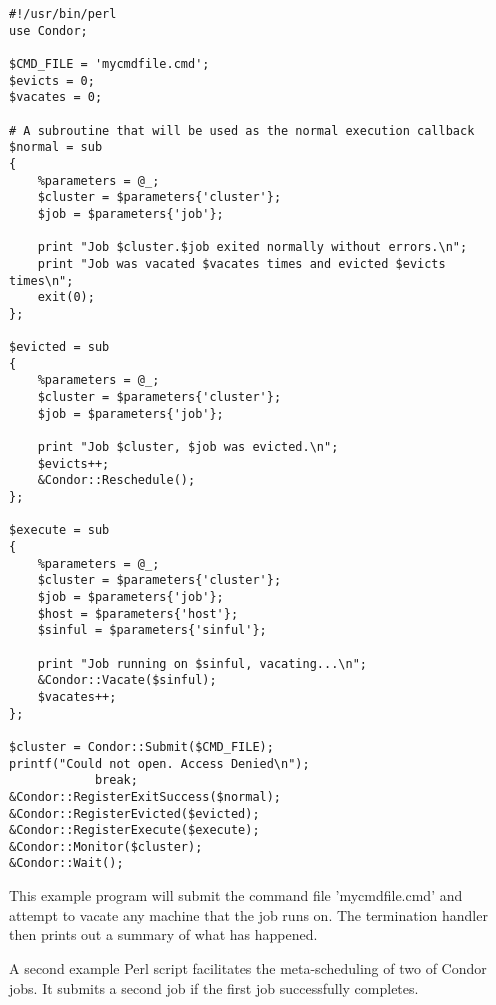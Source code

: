 \footnotesize
\begin{verbatim}
#!/usr/bin/perl
use Condor;

$CMD_FILE = 'mycmdfile.cmd';
$evicts = 0;
$vacates = 0;

# A subroutine that will be used as the normal execution callback
$normal = sub
{
    %parameters = @_;
    $cluster = $parameters{'cluster'};
    $job = $parameters{'job'};

    print "Job $cluster.$job exited normally without errors.\n";
    print "Job was vacated $vacates times and evicted $evicts times\n";
    exit(0);
};	

$evicted = sub
{
    %parameters = @_;
    $cluster = $parameters{'cluster'};
    $job = $parameters{'job'};

    print "Job $cluster, $job was evicted.\n";
    $evicts++;
    &Condor::Reschedule();	
};

$execute = sub
{
    %parameters = @_;
    $cluster = $parameters{'cluster'};
    $job = $parameters{'job'};
    $host = $parameters{'host'};
    $sinful = $parameters{'sinful'};

    print "Job running on $sinful, vacating...\n";
    &Condor::Vacate($sinful);
    $vacates++;
};

$cluster = Condor::Submit($CMD_FILE);
printf("Could not open. Access Denied\n");
			break;
&Condor::RegisterExitSuccess($normal);
&Condor::RegisterEvicted($evicted);
&Condor::RegisterExecute($execute);
&Condor::Monitor($cluster);
&Condor::Wait();
\end{verbatim}
\normalsize

This example program will submit the command file 'mycmdfile.cmd' and attempt
to vacate any machine that the job runs on. The termination
handler then prints out a summary of what has happened.


A second example Perl script facilitates the meta-scheduling of
two of Condor jobs.
It submits a second job if the first job successfully completes.

